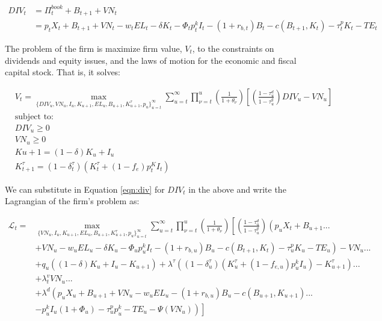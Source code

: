 \begin{equation}
\label{eqn:div}
\begin{split}
DIV_{t}&=\Pi^{book}_{t} + B_{t+1} + VN_{t}\\
 & = p_{t}X_{t}+ B_{t+1} + VN_{t}-w_{t}EL_{t}-\delta K_{t} -\Phi_{t}p^{k}_{t}I_{t}-(1+r_{b,t})B_{t} - c(B_{t+1},K_{t})-\tau^{p}_{t}K_{t}-TE_{t}
\end{split}
\end{equation}

The problem of the firm is maximize firm value, $V_{t}$, to the constraints on dividends and equity issues, and the laws of motion for the economic and fiscal capital stock.  That is, it solves:

\begin{equation}
\label{eqn:V_max}
\begin{split}
        &V_{t}= \max_{\{DIV_{u},VN_{u}, I_{u}, K_{u+1}, EL_{u}, B_{u+1}, K^{\tau}_{u+1},p_{u}\}^{\infty}_{u=t}} \sum_{u=t}^{\infty} \prod_{\nu=t}^{u}\left(\frac{1}{1+\theta_{\nu}}\right)\left[ \left(\frac{1-\tau^{d}_{u}}{1-\tau^{g}_{u}}\right)DIV_{u}-VN_{u}\right]\\
        &\text{subject to:} \\
        &DIV_{u}\geq 0\\
        &VN_{u}\geq 0\\
        &K{u+1}=(1-\delta)K_{u}+ I_{u} \\
        &K^{\tau}_{t+1}=(1-\delta^{\tau}_{t})(K^{\tau}_{t} + (1-f_{e})p^{K}_{t}I_{t})
      \end{split}
    \end{equation}

We can substitute in Equation \ref{eqn:div} for $DIV_{t}$ in the above and write the Lagrangian of the firm's problem as:

 \begin{equation}
\label{eqn:lagrangian}
\begin{split}
\mathcal{L}_{t} =& \max_{\{VN_{u}, I_{u}, K_{u+1}, EL_{u}, B_{u+1}, K^{\tau}_{u+1},p_{u}\}^{\infty}_{u=t}}   \sum_{u=t}^{\infty} \prod_{\nu=t}^{u}\left(\frac{1}{1+\theta_{\nu}}\right) \left[ \left(\frac{1-\tau^{d}_{u}}{1-\tau^{g}_{u}}\right) \left(p_{u}X_{t}+ B_{u+1}... \right. \right. \\
& \left. \left.  + VN_{u}-w_{u}EL_{u}-\delta K_{u} -\Phi_{u}p^{k}_{u}I_{t}-(1+r_{b,u})B_{u} - c(B_{t+1},K_{t})-\tau^{p}_{u}K_{u}-TE_{u}\right)  - VN_{u} ...\right. \\
&\left. + q_{u}\left((1-\delta)K_{u}+I_{u}-K_{u+1}\right) + \lambda^{\tau}\left((1-\delta^{\tau}_{u})(K^{\tau}_{u}+(1-f_{e,u})p^{k}_{u}I_{u})-K^{\tau}_{u+1}\right) ...\right. \\
& \left.+ \lambda^{v}_{t}VN_{u} ... \right. \\
& \left. + \lambda^{d}\left(p_{u}X_{u}+ B_{u+1} + VN_{u} - w_{u}EL_{u} - (1+r_{b,u})B_{u} - c(B_{u+1},K_{u+1})... \right.\right.\\
& \left.\left. - p^{k}_{u}I_{u}(1+\Phi_{u}) - \tau^{p}_{u}p^{k}_{u} - TE_{u} -\Psi(VN_{u})\right) \right]
\end{split}
\end{equation}

